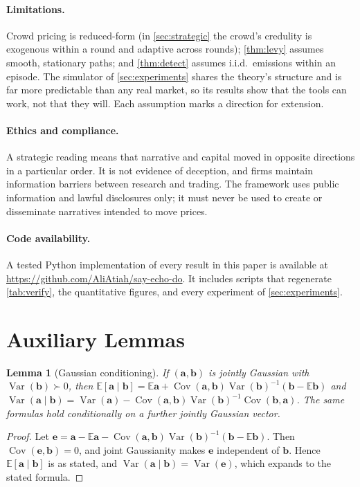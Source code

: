 \documentclass[11pt,a4paper]{article}
\theoremstyle{plain}
\newtheorem{lemma}[theorem]{Lemma}
\theoremstyle{definition}
\theoremstyle{remark}
\newcommand{\E}{\mathbb{E}}
\DeclareMathOperator{\Var}{Var}
\DeclareMathOperator{\Cov}{Cov}
\begin{document}
\paragraph{Limitations.} Crowd pricing is reduced-form (in \cref{sec:strategic} the crowd's credulity is exogenous within a round and adaptive across rounds); \cref{thm:levy} assumes smooth, stationary paths; and \cref{thm:detect} assumes i.i.d.\ emissions within an episode. The simulator of \cref{sec:experiments} shares the theory's structure and is far more predictable than any real market, so its results show that the tools can work, not that they will. Each assumption marks a direction for extension.

\paragraph{Ethics and compliance.} A strategic reading means that narrative and capital moved in opposite directions in a particular order. It is not evidence of deception, and firms maintain information barriers between research and trading. The framework uses public information and lawful disclosures only; it must never be used to create or disseminate narratives intended to move prices.

\paragraph{Code availability.} A tested Python implementation of every result in this paper is available at \url{https://github.com/AliAtiah/say-echo-do}. It includes scripts that regenerate \cref{tab:verify}, the quantitative figures, and every experiment of \cref{sec:experiments}.

\appendix
\section{Auxiliary Lemmas}\label{app:aux}

\begin{lemma}[Gaussian conditioning]\label{lem:gauss}
If $(\bm a,\bm b)$ is jointly Gaussian with $\Var(\bm b)\succ0$, then $\E[\bm a\mid\bm b]=\E\bm a+\Cov(\bm a,\bm b)\Var(\bm b)^{-1}(\bm b-\E\bm b)$ and $\Var(\bm a\mid\bm b)=\Var(\bm a)-\Cov(\bm a,\bm b)\Var(\bm b)^{-1}\Cov(\bm b,\bm a)$. The same formulas hold conditionally on a further jointly Gaussian vector.
\end{lemma}
\begin{proof}
Let $\bm e=\bm a-\E\bm a-\Cov(\bm a,\bm b)\Var(\bm b)^{-1}(\bm b-\E\bm b)$. Then $\Cov(\bm e,\bm b)=0$, and joint Gaussianity makes $\bm e$ independent of $\bm b$. Hence $\E[\bm a\mid\bm b]$ is as stated, and $\Var(\bm a\mid\bm b)=\Var(\bm e)$, which expands to the stated formula.
\end{proof}
\end{document}
